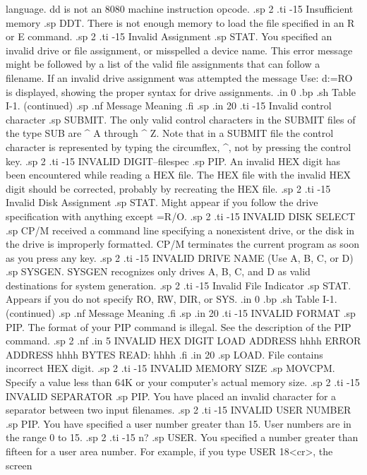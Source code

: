 language.  dd is not an 8080 machine instruction opcode.
.sp 2
.ti -15
Insufficient memory
.sp 
DDT.  There is not enough memory to load the file specified in an 
R or E command.
.sp 2
.ti -15
Invalid Assignment
.sp
STAT.  You specified an invalid drive or file assignment, or 
misspelled a device name.  This error message might be followed 
by a list of the valid file assignments that can follow a 
filename.  If an invalid drive assignment was attempted the 
message Use: d:=RO is displayed, showing the proper syntax for 
drive assignments.
.in 0
.bp
.sh
                     Table I-1.  (continued)
.sp
.nf
     Message        Meaning
.fi
.sp
.in 20
.ti -15
Invalid control character
.sp 
SUBMIT.  The only valid control characters in the SUBMIT files of 
the type SUB are ^ A through ^ Z.  Note that in a SUBMIT file the 
control character is represented by typing the circumflex, ^, not 
by pressing the control key.
.sp 2
.ti -15
INVALID DIGIT--{filespec}
.sp
PIP.  An invalid HEX digit has been encountered while reading a 
HEX file.  The HEX file with the invalid HEX digit should be 
corrected, probably by recreating the HEX file.
.sp 2
.ti -15
Invalid Disk Assignment
.sp
STAT.  Might appear if you follow the drive specification with 
anything except =R/O.
.sp 2
.ti -15
INVALID DISK SELECT
.sp
CP/M received a command line specifying a nonexistent drive, or 
the disk in the drive is improperly formatted.  CP/M terminates 
the current program as soon as you press any key.
.sp 2
.ti -15
INVALID DRIVE NAME (Use A, B, C, or D)
.sp 
SYSGEN.  SYSGEN recognizes only drives A, B, C, and D as valid 
destinations for system generation.
.sp 2
.ti -15
Invalid File Indicator
.sp
STAT.  Appears if you do not specify RO, RW, DIR, or SYS.
.in 0
.bp
.sh
                     Table I-1.  (continued)
.sp
.nf
     Message        Meaning
.fi
.sp
.in 20
.ti -15
INVALID FORMAT
.sp
PIP.  The format of your PIP command is illegal.  See the 
description of the PIP command.
.sp 2
.nf
.in 5
INVALID HEX DIGIT
LOAD ADDRESS hhhh
ERROR ADDRESS hhhh
BYTES READ:
hhhh
.fi
.in 20
.sp
LOAD.  File contains incorrect HEX digit.
.sp 2
.ti -15
INVALID MEMORY SIZE
.sp
MOVCPM.  Specify a value less than 64K or your computer's actual 
memory size.
.sp 2
.ti -15
INVALID SEPARATOR
.sp
PIP.  You have placed an invalid character for a separator 
between two input filenames.
.sp 2
.ti -15
INVALID USER NUMBER
.sp
PIP.  You have specified a user number greater than 15.  User 
numbers are in the range 0 to 15.
.sp 2
.ti -15
n?
.sp
USER.  You specified a number greater than fifteen for a user 
area number.  For example, if you type USER 18<cr>, the screen 
